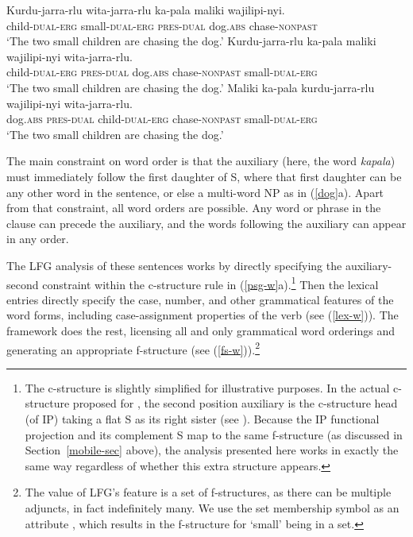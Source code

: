  \begin{exe} 
\ex	\label{dog}
\begin{xlist}
\ex 
\gll Kurdu-jarra-rlu wita-jarra-rlu ka-pala maliki wajilipi-nyi. \\
child-\textsc{dual-erg} small-\textsc{dual-erg} \textsc{pres-dual}
dog.\textsc{abs} chase-\textsc{nonpast}\\
\glt `The two small children are chasing the dog.' 
\ex 
\gll Kurdu-jarra-rlu ka-pala maliki wajilipi-nyi wita-jarra-rlu. \\
child-\textsc{dual-erg}  \textsc{pres-dual}
dog.\textsc{abs} chase-\textsc{nonpast} small-\textsc{dual-erg}\\
\glt `The two small children are chasing the dog.' 
\ex 
\gll Maliki ka-pala  kurdu-jarra-rlu wajilipi-nyi wita-jarra-rlu. \\
dog.\textsc{abs} \textsc{pres-dual} child-\textsc{dual-erg} chase-\textsc{nonpast} small-\textsc{dual-erg} 
\\
\glt `The two small children are chasing the dog.' 
\end{xlist}
\end{exe}
The main constraint on word order is that the auxiliary (here, the word \textit{kapala}) must immediately follow the first daughter of S, where that first daughter can be any other word in the sentence, or else a multi-word NP as in (\ref{dog}a).  Apart from that constraint, all word orders are possible.  Any word or phrase in the clause can precede the auxiliary, and the words following the auxiliary can appear in any order. 

The LFG analysis of these sentences works by directly specifying the auxiliary-second constraint within the c-structure rule in (\ref{psg-w}a).\footnote{The c-structure is slightly simplified for illustrative purposes. In the actual c-structure proposed for , the second position auxiliary is the c-structure head (of IP) taking a flat S as its right sister (see \citealt[225]{austin+bresnan:1996}).  Because the IP functional projection and its complement S map to the same f-structure (as discussed in Section~\ref{mobile-sec} above),  the analysis presented here works in exactly the same way regardless of whether this extra structure appears.}  Then the lexical entries directly specify the case, number, and other grammatical features of the word forms, including case-assignment properties of the verb (see (\ref{lex-w})).  The framework does the rest, licensing all and only grammatical word orderings and generating an appropriate f-structure (see (\ref{fs-w})).\footnote{The value of LFG's  feature is a set of f-structures, as there can be multiple adjuncts, in fact indefinitely many. We use the set membership symbol as an attribute \citep[229--230]{dalrymple;ea19}, which results in the f-structure for `small' being in a set.}

